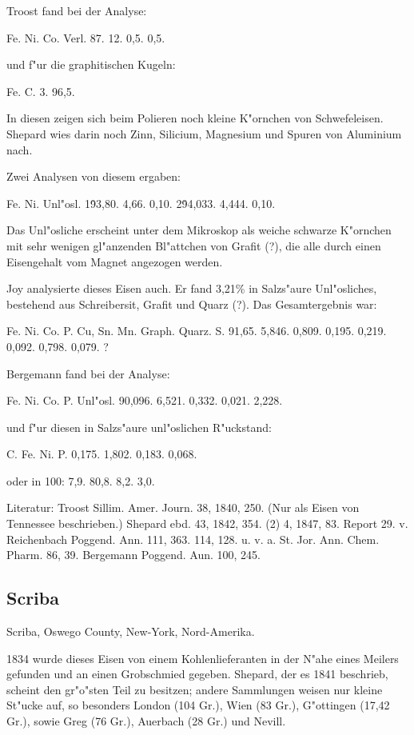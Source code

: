 \documentclass[a4paper, 11pt, oneside]{article}
\begin{document}
Troost fand bei der Analyse:

Fe. Ni. Co. Verl.  
87. 12. 0,5. 0,5.

und f"ur die graphitischen Kugeln:

Fe. C.  
3. 96,5.

In diesen zeigen sich beim Polieren noch kleine K"ornchen von Schwefeleisen. Shepard wies darin noch Zinn, Silicium, Magnesium und Spuren von Aluminium nach.

Zwei Analysen von diesem ergaben:

Fe. Ni. Unl"osl.  
1\. 93,80. 4,66. 0,10.  
2\. 94,033. 4,444. 0,10.

Das Unl"osliche erscheint unter dem Mikroskop als weiche schwarze K"ornchen mit sehr wenigen gl"anzenden Bl"attchen von Grafit (?), die alle durch einen Eisengehalt vom Magnet angezogen werden.

Joy analysierte dieses Eisen auch. Er fand 3,21\% in Salzs"aure Unl"osliches, bestehend aus Schreibersit, Grafit und Quarz (?). Das Gesamtergebnis war:

Fe. Ni. Co. P. Cu, Sn. Mn. Graph. Quarz. S.  
91,65. 5,846. 0,809. 0,195. 0,219. 0,092. 0,798. 0,079. ?

Bergemann fand bei der Analyse:

Fe. Ni. Co. P. Unl"osl.  
90,096. 6,521. 0,332. 0,021. 2,228.

und f"ur diesen in Salzs"aure unl"oslichen R"uckstand:

C. Fe. Ni. P.  
0,175. 1,802. 0,183. 0,068.

oder in 100: 7,9. 80,8. 8,2. 3,0.

Literatur: Troost Sillim. Amer. Journ. 38, 1840, 250. (Nur als Eisen von Tennessee beschrieben.) Shepard ebd. 43, 1842, 354. (2) 4, 1847, 83. Report 29. v. Reichenbach Poggend. Ann. 111, 363. 114, 128. u. v. a. St. Jor. Ann. Chem. Pharm. 86, 39. Bergemann Poggend. Aun. 100, 245.

\subsection{Scriba}

Scriba, Oswego County, New-York, Nord-Amerika.

1834 wurde dieses Eisen von einem Kohlenlieferanten in der N"ahe eines Meilers gefunden und an einen Grobschmied gegeben. Shepard, der es 1841 beschrieb, scheint den gr"o"sten Teil zu besitzen; andere Sammlungen weisen nur kleine St"ucke auf, so besonders London (104 Gr.), Wien (83 Gr.), G"ottingen (17,42 Gr.), sowie Greg (76 Gr.), Auerbach (28 Gr.) und Nevill.
\end{document}
